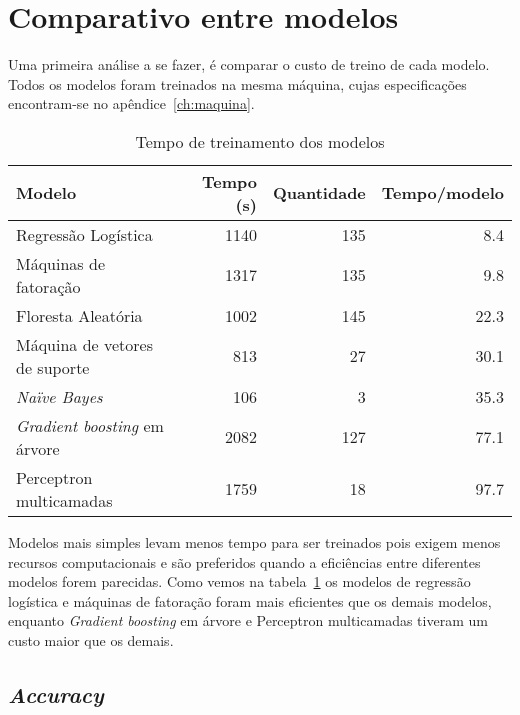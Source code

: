 \section{Comparativo entre modelos}
\label{sec:comparativo-entre-modelos}

Uma primeira análise a se fazer, é comparar o custo de treino de cada modelo.
Todos os modelos foram treinados na mesma máquina, cujas especificações encontram-se no apêndice~\ref{ch:maquina}.

\begin{table}[h]
    \centering
    \begin{tabular}{|l|r|r|r|}
        \hline
        Modelo                               & Tempo (s) & Quantidade & Tempo/modelo \\
        \hline
        Regressão Logística                  & 1140      & 135        & 8.4          \\
        Máquinas de fatoração                & 1317      & 135        & 9.8          \\
        Floresta Aleatória                   & 1002      & 145        & 22.3         \\
        Máquina de vetores de suporte        & 813       & 27         & 30.1         \\
        \textit{Naïve Bayes}                 & 106       & 3          & 35.3         \\
        \textit{Gradient boosting} em árvore & 2082      & 127        & 77.1         \\
        Perceptron multicamadas              & 1759      & 18         & 97.7         \\
        \hline
    \end{tabular}
    \caption{Tempo de treinamento dos modelos}
    \label{tab:modelos-tempo}
\end{table}

Modelos mais simples levam menos tempo para ser treinados pois exigem menos recursos computacionais e são preferidos quando a eficiências entre diferentes modelos forem parecidas.
Como vemos na tabela~\ref{tab:modelos-tempo} os modelos de regressão logística e máquinas de fatoração foram mais eficientes que os demais modelos, enquanto \textit{Gradient boosting} em árvore e Perceptron multicamadas tiveram um custo maior que os demais.

\subsection{\textit{Accuracy}}
\label{subsec:accuracy}

